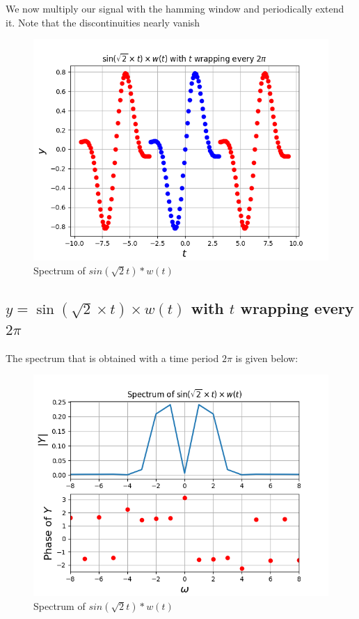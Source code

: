 \documentclass{article}
\begin{document}
We now multiply our signal with the hamming window and periodically extend it. Note that the discontinuities nearly vanish
\begin{figure}[h!]
\centering
\includegraphics[scale=0.6]{Figure_5.png}
\caption{Spectrum of $sin(\sqrt{2}t)*w(t)$}
\label{fig:universe}
\end{figure}
\clearpage

\subsection{$y=\sin\left(\sqrt{2}\times t\right)\times w(t)$ with $t$ wrapping every $2\pi$}

The spectrum that is obtained with a time period $2\pi$ is given below:
\begin{figure}[h!]
\centering
\includegraphics[scale=0.5]{Figure_6.png}
\caption{Spectrum of $sin(\sqrt{2}t)*w(t)$}
\label{fig:universe}
\end{figure}
\end{document}
